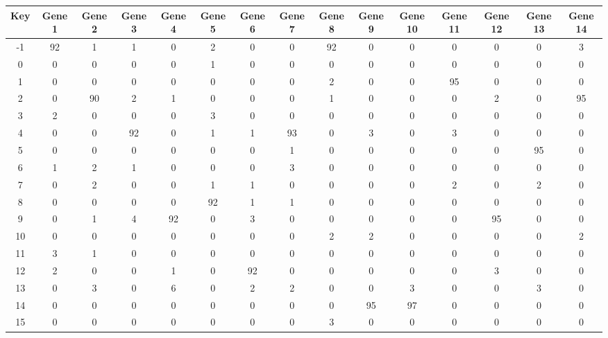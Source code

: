 \begin{tabular}{|c|c|c|c|c|c|c|c|c|c|c|c|c|c|c|}
\hline
Key & Gene 1 & Gene 2 & Gene 3 & Gene 4 & Gene 5 & Gene 6 & Gene 7 & Gene 8 & Gene 9 & Gene 10 & Gene 11 & Gene 12 & Gene 13 & Gene 14 \\
\hline
-1 & 92 & 1 & 1 & 0 & 2 & 0 & 0 & 92 & 0 & 0 & 0 & 0 & 0 & 3 \\
0 & 0 & 0 & 0 & 0 & 1 & 0 & 0 & 0 & 0 & 0 & 0 & 0 & 0 & 0 \\
1 & 0 & 0 & 0 & 0 & 0 & 0 & 0 & 2 & 0 & 0 & 95 & 0 & 0 & 0 \\
2 & 0 & 90 & 2 & 1 & 0 & 0 & 0 & 1 & 0 & 0 & 0 & 2 & 0 & 95 \\
3 & 2 & 0 & 0 & 0 & 3 & 0 & 0 & 0 & 0 & 0 & 0 & 0 & 0 & 0 \\
4 & 0 & 0 & 92 & 0 & 1 & 1 & 93 & 0 & 3 & 0 & 3 & 0 & 0 & 0 \\
5 & 0 & 0 & 0 & 0 & 0 & 0 & 1 & 0 & 0 & 0 & 0 & 0 & 95 & 0 \\
6 & 1 & 2 & 1 & 0 & 0 & 0 & 3 & 0 & 0 & 0 & 0 & 0 & 0 & 0 \\
7 & 0 & 2 & 0 & 0 & 1 & 1 & 0 & 0 & 0 & 0 & 2 & 0 & 2 & 0 \\
8 & 0 & 0 & 0 & 0 & 92 & 1 & 1 & 0 & 0 & 0 & 0 & 0 & 0 & 0 \\
9 & 0 & 1 & 4 & 92 & 0 & 3 & 0 & 0 & 0 & 0 & 0 & 95 & 0 & 0 \\
10 & 0 & 0 & 0 & 0 & 0 & 0 & 0 & 2 & 2 & 0 & 0 & 0 & 0 & 2 \\
11 & 3 & 1 & 0 & 0 & 0 & 0 & 0 & 0 & 0 & 0 & 0 & 0 & 0 & 0 \\
12 & 2 & 0 & 0 & 1 & 0 & 92 & 0 & 0 & 0 & 0 & 0 & 3 & 0 & 0 \\
13 & 0 & 3 & 0 & 6 & 0 & 2 & 2 & 0 & 0 & 3 & 0 & 0 & 3 & 0 \\
14 & 0 & 0 & 0 & 0 & 0 & 0 & 0 & 0 & 95 & 97 & 0 & 0 & 0 & 0 \\
15 & 0 & 0 & 0 & 0 & 0 & 0 & 0 & 3 & 0 & 0 & 0 & 0 & 0 & 0 \\
\hline
\end{tabular}